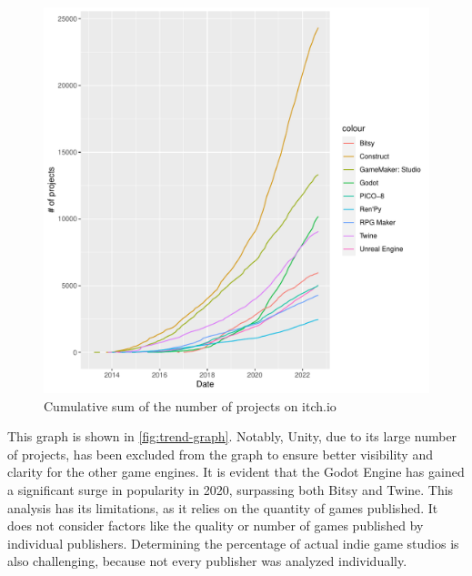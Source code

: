 \begin{figure}[ht!]
    \begin{center}
        \includegraphics[width=1.1\columnwidth]{figures/trend-graph.pdf}
        \caption{\label{fig:trend-graph} Cumulative sum of the number of projects on itch.io}
    \end{center}
\end{figure}

This graph is shown in \autoref{fig:trend-graph}.
Notably, Unity, due to its large number of projects, has been excluded from the graph to ensure better visibility and clarity for the other game engines.
It is evident that the Godot Engine has gained a significant surge in popularity in 2020, surpassing both Bitsy and Twine.
This analysis has its limitations, as it relies on the quantity of games published.
It does not consider factors like the quality or number of games published by individual publishers.
Determining the percentage of actual indie game studios is also challenging, because not every publisher was analyzed individually.

